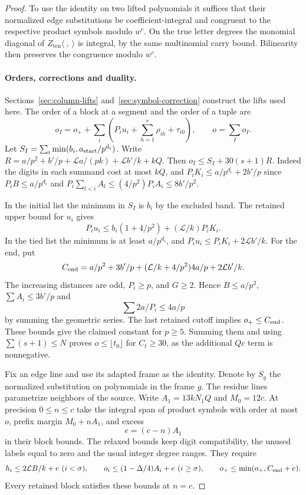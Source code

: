 \begin{proof}
To use the identity on two lifted polynomials it suffices that
their normalized edge substitutions be coefficient-integral
and congruent to the respective product symbols modulo \(w^c\).
On the true letter degrees the monomial diagonal of
\(Z_{\mathrm{ten}}\langle\ ,\ \rangle\) is integral, by the
same multinomial carry bound. Bilinearity then preserves the
congruence modulo \(w^c\). \paragraph{Orders, corrections and duality.}
Sections~\ref{sec:column-lifts} and~\ref{sec:symbol-correction}
construct the lifts used here. The order of a
block at a segment and the order of a tuple are
\[
 o_I=o_++\sum_i\left(P_i u_i+\sum_{h=1}^r\rho_{ih}+\tau_{i0}\right),
 \qquad o=\sum_I o_I .
\]
Let \(S_I=\sum_i\min(b_i,a_{\rm start}/p^{d_i})\). Write
\(R=a/p^2+b'/p+\mathcal L a/(pk)+\mathcal L b'/k+kQ\).
Then \(o_I\le S_I+30(s+1)R\). Indeed the digits in each summand
cost at most \(kQ\), and
\(P_i K_i\le a/p^{d_i}+2b'/p\) since \(P_i B\le a/p^{d_i}\)
and \(P_i\sum_{l<i}A_l\le (4/p^2)P_i A_i\le8b'/p^2\).

In the initial list the minimum in \(S_I\) is \(b_i\) by
the excluded band. The retained upper bound for \(u_i\) gives
\[
 P_iu_i\le b_i(1+4/p^2)+(\mathcal L/k)P_i K_i.
\]
In the tied list the minimum is at least \(a/p^{d_i}\), and
\(P_i u_i\le P_i K_i+2\mathcal L b'/k\).
For the end, put
\[
 C_{\rm end}=a/p^2+3b'/p+
       (\mathcal L/k+4/p^2)4a/p+2\mathcal L b'/k .
\]
The increasing distances are odd, \(P_i\ge p\), and \(G\ge2\).
Hence \(B\le a/p^2\), \(\sum A_i\le3b'/p\) and
\[
 \sum 2a/P_i\le4a/p
\]
by summing the geometric series. The
last retained cutoff implies \(o_+\le C_{\rm end}\). These bounds
give the claimed constant for \(p\ge5\). Summing them and using
\(\sum(s+1)\le N\) proves \(o\le\lfloor t_0\rfloor\)
for \(C_t\ge30\), as the additional \(Qc\) term is nonnegative.

Fix an edge line and use its adapted frame as the identity.
Denote by \(S_g\) the normalized substitution on polynomials
in the frame \(g\). The residue lines parametrize neighbors of
the source. Write \(A_1=13kN_1Q\) and \(M_0=12c\).
At precision \(0\le n\le c\) take the integral span of
product symbols with order at most \(o\), prefix margin
\(M_0+nA_1\), and excess
\[
 e=(c-n)A_1
\]
in their block bounds.
The relaxed bounds keep digit compatibility, the unused labels
equal to zero and the usual integer degree ranges. They require
\[
 h_i\le2\mathcal L B/k+e\ (i<\sigma),\qquad
 o_i\le (1-\Delta/4)A_i+e\ (i\ge\sigma),\qquad
 o_+\le\min(a_+,C_{\rm end}+e).
\]
Every retained block satisfies these bounds at \(n=c\).


\end{proof}
